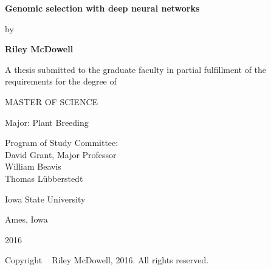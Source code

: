 \begin{titlepage}
\begin{center}

\vspace{1.5cm}

\textbf{Genomic selection with deep neural networks}

\vspace{0.5cm}

by

\vspace{0.5cm}

\textbf{Riley McDowell}

\vspace{1.0cm}

A thesis submitted to the graduate faculty in partial fulfillment of the requirements for the degree of

\vspace{0.5cm}

MASTER OF SCIENCE 

\vspace{0.5cm}

Major: Plant Breeding

\vspace{1.5cm}

Program of Study Committee: \\
David Grant, Major Professor \\
William Beavis \\
Thomas L{\"u}bberstedt \\

\vspace{5.0cm}

Iowa State University

\vspace{0.5cm}

Ames, Iowa

\vspace{0.5cm}

2016

\vspace{1.0cm}

Copyright \textcopyright~ Riley McDowell, 2016. All rights reserved.

\end{center}
\end{titlepage}
